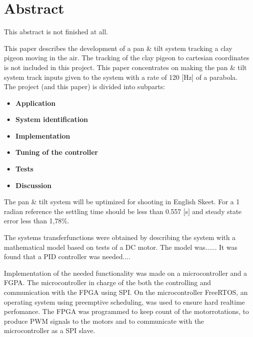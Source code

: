 
\setcounter{page}{1}
\section*{Abstract}

This abstract is not finished at all.

This paper describes the development of a pan \& tilt system tracking a clay 
pigeon moving in the air. 
The tracking of the clay pigeon to cartesian coordinates is not included in this 
project. This paper concentrates on making the pan \& tilt system track inputs 
given to the system with a rate of 120 [Hz] of a parabola.
The project (and this paper) is divided into subparts: 
 
\begin{itemize}
  \item \textbf{Application}
  \item \textbf{System identification} 
  \item \textbf{Implementation}
  \item \textbf{Tuning of the controller} 
  \item \textbf{Tests} 
  \item \textbf{Discussion} 
\end{itemize}

The pan \& tilt system will be uptimized for shooting in English Skeet. For a 1 
radian reference the settling time should be less than 0.557 [s] and steady 
state error less than 1,78\%.

The systems transferfunctions were obtained by describing the system with a 
mathematical model based on tests of a DC motor. The model was...... It was 
found that a PID controller was needed....

Implementation of the needed functionality was made on a microcontroller and a 
FGPA. The microcontroller in charge of the both the controlling and 
communication with the FPGA using SPI. 
On the microcontroller FreeRTOS, an operating system using preemptive scheduling, was used 
to ensure hard realtime perfomance.
The FPGA was programmed to keep count of the motorrotations, to produce PWM 
signals to the motors and to communicate with the microcontroller as a SPI slave.

